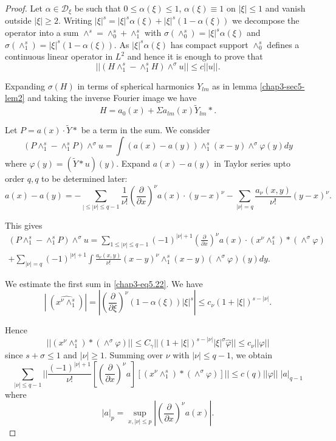 \begin{proof}%
Let $\alpha \in \mathscr{D}_\xi $ be such that $0 \leq \alpha
(\xi) \leq 1$, $\alpha (\xi )  \equiv 1$ on $|\xi | \leq 1$ and
vanish outside $|\xi| \geq 2$. Writing $|\xi|^s = |\xi|^s \alpha
(\xi)+ |\xi|^s (1- \alpha (\xi ))$  we decompose the operator into a
sum $\wedge^s = \wedge^s_0 + \wedge^s_ 1$ with $\sigma(\wedge^s_0)=
|\xi|^s \alpha (\xi)$ and $\sigma (\wedge^s_1) = |\xi|^s (1- \alpha
(\xi))$. As $|\xi|^s \alpha (\xi)$ has compact support $\wedge^s_0$
defines a continuous linear operator in $L^2$ and hence it is enough
to prove that  
$$
||(H \wedge^s_1- \wedge^s_1 H) \wedge^\sigma u|| \leq c || u ||. 
$$

Expanding $\sigma (H)$ in terms of spherical harmonics $Y_{lm}$ as in
lemma \ref{chap3-sec5-lem2} and taking the inverse Fourier image we have 
$$
H = a_0 (x) + \Sigma a_{lm}(x) \tilde{Y}_{lm} \ast. 
$$\pageoriginale

Let $ P = a(x) \cdot\tilde{Y} \ast $ be a term in the sum. We consider 
$$
(P \wedge^s_1 - \wedge^s_1 P) \wedge^\sigma u = \int (a(x) - a(y))
\wedge^s_1 (x-y) \wedge^\sigma \varphi (y) dy 
$$
where $\varphi (y) = (\tilde{Y} * u)(y)$. Expand $a(x)-a(y)$ in Taylor
series upto order $q, q$ to be determined later: 
$$
a(x)- a(y)=- \sum\limits_{|\leq | \nu | \leq q-1} \frac{1}{\nu !}
\left(\frac{\partial }{\partial x}\right)^\nu a(x) \cdot (y-x)^\nu -
\sum\limits_{|\nu|=q} \frac{a_\nu (x,y)}{\nu !}(y-x)^\nu. 
$$

This gives 
\begin{align*}
(P \wedge^s_1 - \wedge^s_1 P) \wedge^\sigma u =  \sum\limits_{1\leq |
    \nu | \leq q-1 } (-1)^{|\nu| +1} \left(\frac{\partial}{\partial x}\right)^\nu
  a (x) \cdot (x^\nu \wedge^s_1 ) * (\wedge^\sigma \varphi )\\
 + \sum\limits_{|\nu |=q}(-1)^{|\nu|+1} \int \frac{a_\nu (x, y)}{\nu
    !}(x-y)^\nu \wedge^s_1 (x-y )(\wedge^\sigma \varphi ) (y)
  dy. \tag{5.22} \label{chap3-eq5.22}
\end{align*}

We estimate the first sum in \eqref{chap3-eq5.22}. We have 
$$
|\ (\widehat{x^\nu \wedge^s_1})|= \left| \left(\frac{\partial}{\partial
  \xi}\right)^\nu (1 - \alpha (\xi )) |\xi|^s \right|\leq c_\nu (1 +
|\xi |)^{s- |\nu|}.  
$$

Hence
$$
|| (x^\nu \wedge^s_1) * (\wedge^\sigma \varphi)|| \leq C_\gamma || (1 +
|\xi|)^{s- |\nu|} |\xi|^\sigma \hat{\varphi}|| \leq c_\nu || \varphi
|| 
$$
since $s + \sigma \leq 1 $ and $|\nu | \geq 1$. Summing over $\nu$
with $|\nu| \leq q-1$, we obtain  
\begin{equation}
\sum\limits_{|\nu | \leq q-1} || \frac{(-1)^{|\nu | +1}}{\nu !}
\left[\left(\frac{\partial}{\partial x}\right)^\nu a\right] \left[(x^\nu \wedge^s_1 ) *
(\wedge^\sigma \varphi )\right]|| \leq c (q) || \varphi ||  \; |a|_{q-1}
\tag{5.23} \label{chap3-eq5.23}
\end{equation}
where 
$$
|a|_p = \sup_{x, | \nu | \leq p} \left| \left(\frac{\partial}{\partial
  x}\right)^\nu a(x) \right|. 
$$


\end{proof}
